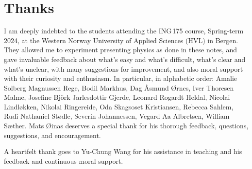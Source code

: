 \documentclass[a4paper,12pt,%
onecolumn,oneside,%
british%
]{memoir}
\newcommand{\addsec}[1]{\section*{#1}\addcontentsline{toc}{section}{#1}}
\renewcommand*{\|}[1][]{\nonscript\:#1\vert\nonscript\:\mathopen{}}
\begin{document}
\iftrue
\addsec{Thanks}
\label{sec:thanks}

I am deeply indebted to the students attending the ING\,175 course, Spring-term 2024, at the Western Norway University of Applied Sciences (HVL) in Bergen. They allowed me to experiment presenting physics as done in these notes, and gave invaluable feedback about what's easy and what's difficult, what's clear and what's unclear, with many suggestions for improvement, and also moral support with their curiosity and enthusiasm. In particular, in alphabetic order: %
Amalie Solberg Magnussen Rege, %
Bodil Markhus, %
Dag Åsmund Ørnes, %
Iver Thoresen Malme, %
Josefine Björk Jarlesdottir Gjerde, %
Leonard Rogardt Heldal, %
Nicolai Lindløkken, %
Nikolai Ringereide, %
Oda Skagsoset Kristiansen, %
Rebecca Sahlem, %
Rudi Nathaniel Stødle, %
Severin Johannessen, %
Vegard Aa Albretsen, %
William Sæther. %
Mats Øinas deserves a special thank for his thorough feedback, questions, suggestions, and encouragement.

A heartfelt thank goes to Yu-Chung Wang for his assistance in teaching and his feedback and continuous moral support.
\fi
\end{document}
